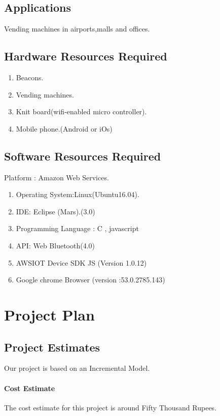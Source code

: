 \documentclass[oneside,a4paper,12pt]{report}
\begin{document}
\section{Applications}

Vending machines in airports,malls and offices.

\section{Hardware Resources Required}
\begin{enumerate}
\item Beacons.
\item Vending machines.
\item Knit board(wifi-enabled micro controller).
\item Mobile phone.(Android or iOs)
\end{enumerate}


\section{Software Resources Required}
Platform : Amazon Web Services.
\begin{enumerate}
\item Operating System:Linux(Ubuntu16.04). 
\item IDE: Eclipse (Mars).(3.0)
\item Programming Language : C , javascript
\item API: Web Bluetooth(4.0)
\item AWSIOT Device SDK JS (Version 1.0.12)
\item Google chrome Browser (version :53.0.2785.143)
\end{enumerate}




\chapter{Project Plan}

\section{Project Estimates}
 Our project is based on an Incremental Model. 
\subsubsection{Cost Estimate}
 The cost estimate for this project is around Fifty Thousand Rupees.
\end{document}
